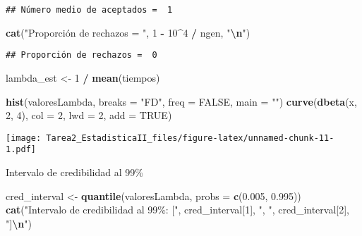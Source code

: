 \documentclass[
]{article}
\newenvironment{Shaded}{\begin{snugshade}}{\end{snugshade}}
\newcommand{\AttributeTok}[1]{\textcolor[rgb]{0.13,0.29,0.53}{#1}}
\newcommand{\ConstantTok}[1]{\textcolor[rgb]{0.56,0.35,0.01}{#1}}
\newcommand{\DecValTok}[1]{\textcolor[rgb]{0.00,0.00,0.81}{#1}}
\newcommand{\FloatTok}[1]{\textcolor[rgb]{0.00,0.00,0.81}{#1}}
\newcommand{\FunctionTok}[1]{\textcolor[rgb]{0.13,0.29,0.53}{\textbf{#1}}}
\newcommand{\NormalTok}[1]{#1}
\newcommand{\OtherTok}[1]{\textcolor[rgb]{0.56,0.35,0.01}{#1}}
\newcommand{\SpecialCharTok}[1]{\textcolor[rgb]{0.81,0.36,0.00}{\textbf{#1}}}
\newcommand{\StringTok}[1]{\textcolor[rgb]{0.31,0.60,0.02}{#1}}
\begin{document}
\begin{verbatim}
## Número medio de aceptados =  1
\end{verbatim}

\begin{Shaded}
\begin{Highlighting}[]
\FunctionTok{cat}\NormalTok{(}\StringTok{"Proporción de rechazos = "}\NormalTok{, }\DecValTok{1} \SpecialCharTok{{-}} \DecValTok{10}\SpecialCharTok{\^{}}\DecValTok{4} \SpecialCharTok{/}\NormalTok{ ngen, }\StringTok{"}\SpecialCharTok{\textbackslash{}n}\StringTok{"}\NormalTok{)}
\end{Highlighting}
\end{Shaded}

\begin{verbatim}
## Proporción de rechazos =  0
\end{verbatim}

\begin{Shaded}
\begin{Highlighting}[]
\NormalTok{lambda\_est }\OtherTok{\textless{}{-}} \DecValTok{1} \SpecialCharTok{/} \FunctionTok{mean}\NormalTok{(tiempos)}

\FunctionTok{hist}\NormalTok{(valoresLambda, }\AttributeTok{breaks =} \StringTok{"FD"}\NormalTok{, }\AttributeTok{freq =} \ConstantTok{FALSE}\NormalTok{, }\AttributeTok{main =} \StringTok{""}\NormalTok{)}
\FunctionTok{curve}\NormalTok{(}\FunctionTok{dbeta}\NormalTok{(x, }\DecValTok{2}\NormalTok{, }\DecValTok{4}\NormalTok{), }\AttributeTok{col =} \DecValTok{2}\NormalTok{, }\AttributeTok{lwd =} \DecValTok{2}\NormalTok{, }\AttributeTok{add =} \ConstantTok{TRUE}\NormalTok{)}
\end{Highlighting}
\end{Shaded}

\texttt{[image: Tarea2\_EstadisticaII\_files/figure-latex/unnamed-chunk-11-1.pdf]}

Intervalo de credibilidad al 99\%

\begin{Shaded}
\begin{Highlighting}[]
\NormalTok{cred\_interval }\OtherTok{\textless{}{-}} \FunctionTok{quantile}\NormalTok{(valoresLambda, }\AttributeTok{probs =} \FunctionTok{c}\NormalTok{(}\FloatTok{0.005}\NormalTok{, }\FloatTok{0.995}\NormalTok{))}
\FunctionTok{cat}\NormalTok{(}\StringTok{"Intervalo de credibilidad al 99\%: ["}\NormalTok{, cred\_interval[}\DecValTok{1}\NormalTok{], }\StringTok{", "}\NormalTok{, cred\_interval[}\DecValTok{2}\NormalTok{], }\StringTok{"]}\SpecialCharTok{\textbackslash{}n}\StringTok{"}\NormalTok{)}
\end{Highlighting}
\end{Shaded}
\end{document}
